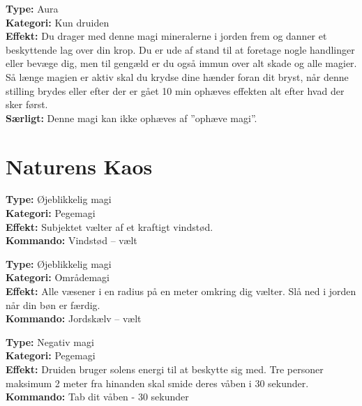\begin{nbesk*}[Stenform]
\textbf{Type:} Aura \\
\textbf{Kategori:} Kun druiden \\
\textbf{Effekt:} Du drager med denne magi mineralerne i jorden frem og danner et beskyttende lag over din krop. Du er ude af stand til at foretage nogle handlinger eller bevæge dig, men til gengæld er du også immun over alt skade og alle magier.\\
Så længe magien er aktiv skal du krydse dine hænder foran dit bryst, når denne stilling brydes eller efter der er gået 10 min ophæves effekten alt efter hvad der sker først.\\
\textbf{Særligt:} Denne magi kan ikke ophæves af ”ophæve magi”.
\end{nbesk*}

\section*{Naturens Kaos}
\begin{nkaos*}[Vindstød]
\textbf{Type:} Øjeblikkelig magi\\ 
\textbf{Kategori:} Pegemagi\\
\textbf{Effekt:} Subjektet vælter af et kraftigt vindstød.\\
\textbf{Kommando:} Vindstød – vælt
\end{nkaos*}

\begin{nkaos*}[Jordskælv]
\textbf{Type:} Øjeblikkelig magi\\ 
\textbf{Kategori:} Områdemagi\\
\textbf{Effekt:} Alle væsener i en radius på en meter omkring dig vælter. Slå ned i jorden når din bøn er færdig.\\
\textbf{Kommando:} Jordskælv – vælt

\end{nkaos*}

\begin{nkaos*}
\textbf{Type:} Negativ magi\\
\textbf{Kategori:} Pegemagi\\
\textbf{Effekt:} Druiden bruger solens energi til at beskytte sig med. Tre personer maksimum 2 meter fra hinanden skal smide deres våben i 30 sekunder.\\
\textbf{Kommando:} Tab dit våben - 30 sekunder

\end{nkaos*}

